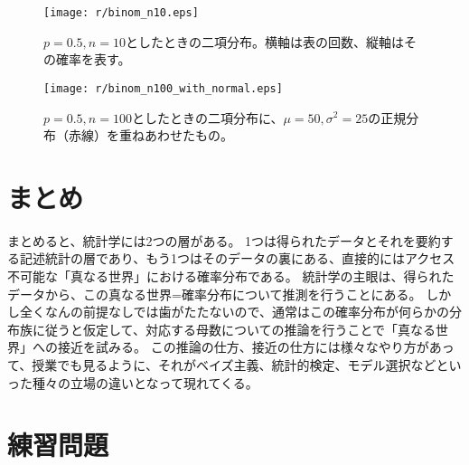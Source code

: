 \documentclass{jsarticle}
\begin{document}
\begin{figure}[h]
\begin{minipage}{0.45\textwidth}
 \centering
 \texttt{[image: r/binom\_n10.eps]}
 \caption{$p=0.5, n=10$としたときの二項分布。横軸は表の回数、縦軸はその確率を表す。}
\end{minipage} 
\begin{minipage}{0.45\textwidth}
 \centering
 \texttt{[image: r/binom\_n100\_with\_normal.eps]} 
 \caption{$p=0.5, n=100$としたときの二項分布に、$\mu=50, \sigma^2=25$の正規分布（赤線）を重ねあわせたもの。}
\end{minipage} 
\end{figure}



\section{まとめ}
まとめると、統計学には2つの層がある。
1つは得られたデータとそれを要約する記述統計の層であり、もう1つはそのデータの裏にある、直接的にはアクセス不可能な「真なる世界」における確率分布である。
統計学の主眼は、得られたデータから、この真なる世界=確率分布について推測を行うことにある。
しかし全くなんの前提なしでは歯がたたないので、通常はこの確率分布が何らかの分布族に従うと仮定して、対応する母数についての推論を行うことで「真なる世界」への接近を試みる。
この推論の仕方、接近の仕方には様々なやり方があって、授業でも見るように、それがベイズ主義、統計的検定、モデル選択などといった種々の立場の違いとなって現れてくる。


\section*{練習問題}
\end{document}
